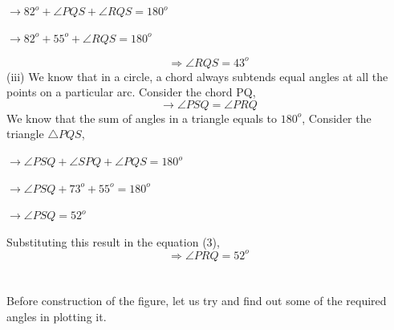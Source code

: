 \documentclass[8pt, twocolumn]{article}
\begin{document}
\begin{center}
    $\rightarrow 82^o + \angle PQS + \angle RQS = 180^o $
\end{center}
\begin{center}
    $\rightarrow 82^o + 55^o + \angle RQS = 180^o$
\end{center}
\begin{equation}
    \Rightarrow \angle RQS = 43^o
\end{equation}
(iii) We know that in a circle, a chord always subtends equal angles at all the points on a particular arc. Consider the chord PQ,
\begin{equation}
    \rightarrow \angle PSQ = \angle PRQ
\end{equation}
We know that the sum of angles in a triangle equals to $180^o$, Consider the triangle $\triangle PQS$,
\begin{center}
    $\rightarrow \angle PSQ + \angle SPQ + \angle PQS = 180^o$ 
\end{center}
\begin{center}
    $\rightarrow \angle PSQ + 73^o + 55^o = 180^o $
\end{center}
\begin{center}
    $\rightarrow \angle PSQ = 52^o$
\end{center}
Substituting this result in the equation (3),
\begin{equation}
    \Rightarrow \angle PRQ = 52^o
\end{equation}\\\\
Before construction of the figure, let us try and find out some of the required angles in plotting it.\\
\end{document}

